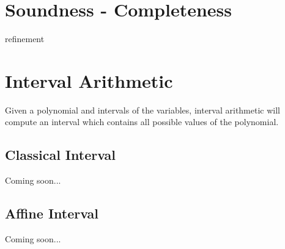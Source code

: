 \section{Soundness - Completeness}
refinement
\section{Interval Arithmetic}
Given a polynomial and intervals of the variables, interval arithmetic will compute an interval which contains all possible values of the polynomial. 
\subsection{Classical Interval}
Coming soon...
\subsection{Affine Interval}
Coming soon...

